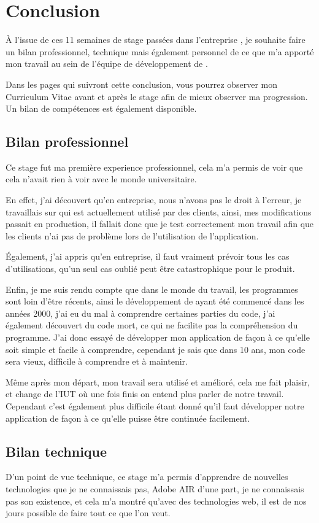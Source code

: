 ﻿\chapter{Conclusion}
\`A l'issue de ces 11 semaines de stage passées dans l'entreprise \mbx{}, je souhaite faire un bilan professionnel, technique mais également personnel de ce que m'a apporté mon travail au sein de l'équipe de développement de \adt{}.

Dans les pages qui suivront cette conclusion, vous pourrez observer mon Curriculum Vitae avant et après le stage afin de mieux observer ma progression. Un bilan de compétences est également disponible.
\section{Bilan professionnel}
    Ce stage fut ma première experience professionnel, cela m'a permis de voir que cela n'avait rien à voir avec le monde universitaire.

    En effet, j'ai découvert qu'en entreprise, nous n'avons pas le droit à l'erreur, je travaillais sur \adt{} qui est actuellement utilisé par des clients, ainsi, mes modifications passait en production, il fallait donc que je test correctement mon travail afin que les clients n'ai pas de problème lors de l'utilisation de l'application.

    \'Egalement, j'ai appris qu'en entreprise, il faut vraiment prévoir tous les cas d'utilisations, qu'un seul cas oublié peut être catastrophique pour le produit.

    Enfin, je me suis rendu compte que dans le monde du travail, les programmes sont loin d'être récents, ainsi le développement de \adt{} ayant été commencé dans les années 2000, j'ai eu du mal à comprendre certaines parties du code, j'ai également découvert du code mort, ce qui ne facilite pas la compréhension du programme. J'ai donc essayé de développer mon application de façon à ce qu'elle soit simple et facile à comprendre, cependant je sais que dans 10 ans, mon code sera vieux, difficile à comprendre et à maintenir.

    Même après mon départ, mon travail sera utilisé et amélioré, cela me fait plaisir, et change de l'IUT où une fois finis on entend plus parler de notre travail. Cependant c'est également plus difficile étant donné qu'il faut développer notre application de façon à ce qu'elle puisse être continuée facilement.
\section{Bilan technique}
D'un point de vue technique, ce stage m'a permis d'apprendre de nouvelles technologies que je ne connaissais pas, Adobe AIR d'une part, je ne connaissais pas son existence, et cela m'a montré qu'avec des technologies web, il est de nos jours possible de faire tout ce que l'on veut.

